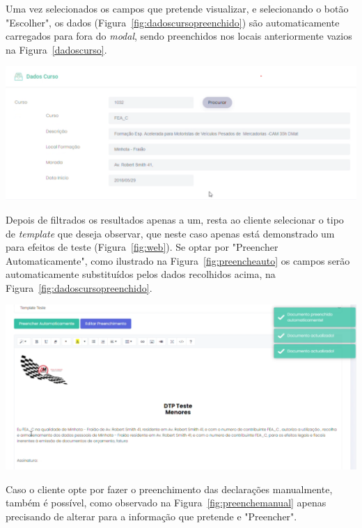 Uma vez selecionados os campos que pretende visualizar, e selecionando o botão "Escolher", os dados (Figura~\ref{fig:dadoscursopreenchido}) são automaticamente carregados para fora do \textit{modal}, sendo preenchidos nos locais anteriormente vazios na Figura~\ref{dadoscurso}.

\begin{center}
        \includegraphics[width=\textwidth,height=\textheight,keepaspectratio]{images/dadoscursopreenchido.png}
        \label{fig:dadoscursopreenchido}
\end{center}

Depois de filtrados os resultados apenas a um, resta ao cliente selecionar o tipo de \textit{template} que deseja observar, que neste caso apenas está demonstrado um para efeitos de teste (Figura~\ref{fig:web}). Se optar por "Preencher Automaticamente", como ilustrado na Figura~\ref{fig:preencheauto} os campos serão automaticamente substituídos pelos dados recolhidos acima, na Figura~\ref{fig:dadoscursopreenchido}.

\begin{center}
        \includegraphics[width=\textwidth,height=\textheight,keepaspectratio]{images/preencheauto.png}
        \label{fig:preencheauto}
\end{center}

Caso o cliente opte por fazer o preenchimento das declarações manualmente, também é possível, como observado na Figura~\ref{fig:preenchemanual} apenas precisando de alterar para a informação que pretende e "Preencher".

